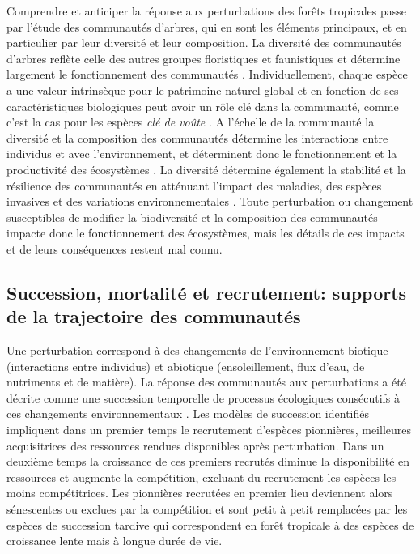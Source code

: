 \documentclass[
  11pt,
  french,
  A4paper,
  extrafontsizes,onecolumn,openright
  ]{memoir}
\begin{document}
Comprendre et anticiper la réponse aux perturbations des forêts
tropicales passe par l'étude des communautés d'arbres, qui en sont les
éléments principaux, et en particulier par leur diversité et leur
composition. La diversité des communautés d'arbres reflète celle des
autres groupes floristiques et faunistiques et détermine largement le
fonctionnement des communautés \autocite{Guitet2017}. Individuellement,
chaque espèce a une valeur intrinsèque pour le patrimoine naturel global
et en fonction de ses caractéristiques biologiques peut avoir un rôle
clé dans la communauté, comme c'est la cas pour les espèces \emph{clé de
voûte} \autocites{Jones1994}{Power1996}{Gardner2007}. A l'échelle de la
communauté la diversité et la composition des communautés détermine les
interactions entre individus et avec l'environnement, et déterminent
donc le fonctionnement et la productivité des écosystèmes
\autocite{Begon2006}. La diversité détermine également la stabilité et
la résilience des communautés en atténuant l'impact des maladies, des
espèces invasives et des variations environnementales
\autocite{Elmqvist2003}. Toute perturbation ou changement susceptibles
de modifier la biodiversité et la composition des communautés impacte
donc le fonctionnement des écosystèmes, mais les détails de ces impacts
et de leurs conséquences restent mal connu.

\subsection{Succession, mortalité et recrutement: supports de la
trajectoire des
communautés}\label{succession-mortalite-et-recrutement-supports-de-la-trajectoire-des-communautes}

Une perturbation correspond à des changements de l'environnement
biotique (interactions entre individus) et abiotique (ensoleillement,
flux d'eau, de nutriments et de matière). La réponse des communautés aux
perturbations a été décrite comme une succession temporelle de processus
écologiques consécutifs à ces changements environnementaux
\autocite{Clements1916}. Les modèles de succession identifiés impliquent
dans un premier temps le recrutement d'espèces pionnières, meilleures
acquisitrices des ressources rendues disponibles après perturbation.
Dans un deuxième temps la croissance de ces premiers recrutés diminue la
disponibilité en ressources et augmente la compétition, excluant du
recrutement les espèces les moins compétitrices. Les pionnières
recrutées en premier lieu deviennent alors sénescentes ou exclues par la
compétition et sont petit à petit remplacées par les espèces de
succession tardive qui correspondent en forêt tropicale à des espèces de
croissance lente mais à longue durée de vie.
\end{document}
